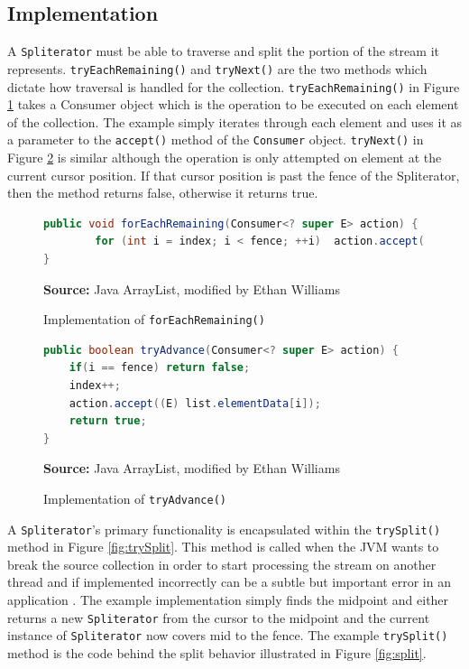 \documentclass[oneside, 12pt]{article}
\newcommand{\source}[1]{\textbf{Source:} {#1} }
\begin{document}
\subsection{Implementation} 
A \verb|Spliterator| must be able to traverse and split the portion of the stream it represents. \verb|tryEachRemaining()| and \verb|tryNext()| are the two methods which dictate how traversal is handled for the collection. \verb|tryEachRemaining()| in Figure \ref{fig:forEachRemaining} takes a Consumer object which is the operation to be executed on each element of the collection. The example simply iterates through each element and uses it as a parameter to the \verb|accept()| method of the \verb|Consumer| object. \verb|tryNext()| in Figure \ref{fig:tryAdvance} is similar although the operation is only attempted on element at the current cursor position. If that cursor position is past the fence of the Spliterator, then the method returns false, otherwise it returns true.

\begin{figure}[H]
\centering
\begin{lstlisting}[language=Java]
public void forEachRemaining(Consumer<? super E> action) {
        for (int i = index; i < fence; ++i)  action.accept((E) list.elementData[i]);
}
\end{lstlisting}
\caption{Implementation of {\tt forEachRemaining()}}
\source{Java ArrayList, modified by Ethan Williams}
\label{fig:forEachRemaining}
\end{figure}

\begin{figure}[H]
\centering
\begin{lstlisting}[language=Java]
public boolean tryAdvance(Consumer<? super E> action) {
    if(i == fence) return false;
    index++;
    action.accept((E) list.elementData[i]);
    return true;
}
\end{lstlisting}
\caption{Implementation of {\tt tryAdvance()}}
\source{Java ArrayList, modified by Ethan Williams}
\label{fig:tryAdvance}
\end{figure}

A \verb|Spliterator|'s primary functionality is encapsulated within the \verb|trySplit()| method in Figure \ref{fig:trySplit}. This method is called when the JVM wants to break the source collection in order to start processing the stream on another thread and if implemented incorrectly can be a subtle but important error in an application \autocite{}. The example implementation simply finds the midpoint and either returns a new \verb|Spliterator| from the cursor to the midpoint and the current instance of \verb|Spliterator| now covers mid to the fence. The example \verb|trySplit()| method is the code behind the split behavior illustrated in Figure \ref{fig:split}.
\end{document}
